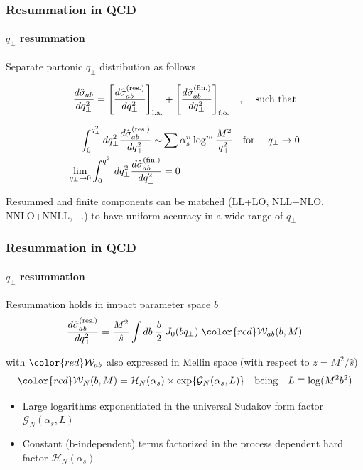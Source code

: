 \documentclass[aspectratio=43]{beamer}
\begin{document}
\begin{frame}

	\frametitle{Resummation in QCD}
	\framesubtitle{$q_{\perp}$ resummation}

	Separate partonic $q_{\perp}$ distribution as follows
	
	\begin{equation}
		\frac{d\hat{\sigma}_{ab}}{dq_{\perp}^{2}} =
		\Bigg[ \frac{d\hat{\sigma}^{\textrm{(res.)}}_{ab}}{dq_{\perp}^{2}} \Bigg]_{\textrm{l.a.}} + 
		\Bigg[ \frac{d\hat{\sigma}^{\textrm{(fin.)}}_{ab}}{dq_{\perp}^{2}} \Bigg]_{\textrm{f.o.}} \textrm{\quad, \quad such that} \nonumber
	\end{equation}

	\begin{align}
		\int_{0}^{q_{\perp}^{2}} dq_{\perp}^{2} \frac{d\hat{\sigma}^{\textrm{(res.)}}_{ab}}{dq_{\perp}^{2}} \sim & \sum \alpha_{s}^{n} \log^{m} \frac{M^{2}}{q_{\perp}^{2}} \textrm{\quad for \quad} q_{\perp} \rightarrow 0 \nonumber \\
		\lim_{q_{\perp} \rightarrow 0}\int_{0}^{q_{\perp}^{2}} dq_{\perp}^{2} \frac{d\hat{\sigma}^{\textrm{(fin.)}}_{ab}}{dq_{\perp}^{2}} &= 0 \nonumber 
	\end{align}

	Resummed and finite components can be matched (LL+LO, NLL+NLO, NNLO+NNLL, ...) to have uniform accuracy in a wide range of $q_{\perp}$
\end{frame}

\begin{frame}

	\frametitle{Resummation in QCD}
	\framesubtitle{$q_{\perp}$ resummation}
	
	Resummation holds in impact parameter space $b$
	\begin{equation}
		\frac{d\hat{\sigma}_{ab}^{\textrm{(res.)}}}{dq_{\perp}^{2}} = \frac{M^{2}}{\hat{s}} \int db \; \frac{b}{2} \; J_{0}(b q_{\perp}) \; {\color{red} \mathcal{W}_{ab}(b, M)} \nonumber
	\end{equation}
	
	with ${\color{red}\mathcal{W}_{ab}}$ also expressed in Mellin space (with respect to $z = M^{2}/\hat{s}$)
	\begin{equation}
		{\color{red} \mathcal{W}_{N}(b, M) = \mathcal{H}_{N}(\alpha_{s}) \times \exp\{\mathcal{G}_{N}(\alpha_{s}, L)\}} \quad\textrm{being}\quad L \equiv \log(M^{2}b^{2}) \nonumber
	\end{equation}

	\begin{itemize}
		\item Large logarithms exponentiated in the universal Sudakov form factor {\color{red}$\mathcal{G}_{N}(\alpha_{s}, L)$}
		\item Constant (b-independent) terms factorized in the process dependent hard factor {\color{red}$\mathcal{H}_{N}(\alpha_{s})$}
	\end{itemize}

	
\end{frame}
\end{document}
